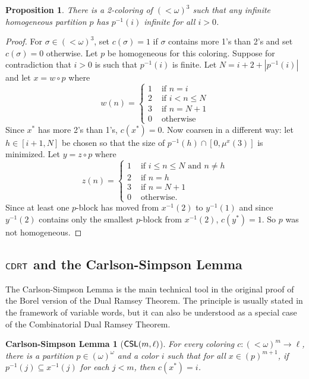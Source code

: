 \documentclass{amsart}
\newtheorem{prop}[thm]{Proposition}
\newtheorem*{carlsonsimpsonlemma}{Carlson-Simpson Lemma}
\theoremstyle{definition}
\theoremstyle{remark}
\newcommand{\system}[1]{\mbox{\fontfamily{cmss}\fontshape{n}\fontseries{m}%
    \selectfont#1}}
\newcommand{\cDRT}{\system{CDRT}}
\newcommand{\CSL}{\system{CSL}}
\newcommand{\block}[2]{{#1}^{-1}(#2)}
\begin{document}
\begin{prop}
\label{prop:2.13}
There is a 2-coloring of $(<\omega)^3$ such that any infinite homogeneous partition $p$ has $\block{p}{i}$ infinite for all $i > 0$.
\end{prop}

\begin{proof}
For $\sigma \in (<\omega)^3$, set $c(\sigma) = 1$ if $\sigma$ contains more 1's than 2's and set $c(\sigma)= 0$ 
otherwise. Let $p$ be homogeneous for this coloring.  Suppose for 
contradiction that $i > 0$ is such that $\block{p}{i}$ is finite. Let $N = i + 2 + |\block{p}{i}|$ and let $x = w\circ p$ where 
$$w(n) = \begin{cases} 1 &\text{ if } n=i\\
2 & \text{ if } i < n \leq N\\
3 & \text{ if } n = N+1\\
0 & \text{ otherwise}\end{cases}$$
Since $x^\ast$ has more 2's than 1's, 
$c(x^\ast) = 0$. Now coarsen in a different way: let $h \in [i+1,N]$ 
be chosen so that the size of $\block{p}{h}\cap [0,\mu^x(3)]$ is minimized. 
Let $y= z \circ p$ where
$$z(n) = \begin{cases} 1 & \text{ if } i\leq n \leq N \text{ and } n \neq h\\
                                    2 & \text{ if } n=h\\
                                    3 & \text{ if } n = N+1\\
                                    0 & \text{ otherwise.}\end{cases}$$
Since at least one $p$-block has moved from $\block{x}{2}$ to $\block{y}{1}$ and since $\block{y}{2}$ contains only the smallest $p$-block from $\block{x}{2}$, $c(y^\ast) = 1$.  So $p$ was not homogeneous.
\end{proof}


\subsection{$\cDRT$ and the Carlson-Simpson Lemma}\label{sec:2.3}

The Carlson-Simpson Lemma is the main technical tool in the original proof of the Borel version of the 
Dual Ramsey Theorem. The principle is usually stated in the framework of variable
words, but it can also be understood as a special case of the Combinatorial Dual Ramsey Theorem.  

\begin{carlsonsimpsonlemma}[$\CSL(m,\ell)$]
For every coloring $c:(<\omega)^{m} \rightarrow \ell$, there is a
partition $p\in(\omega)^\omega$ and a color $i$ such that for all $x
\in (p)^{m+1}$, if $\block{p}{j} \subseteq \block{x}{j}$ for each $j<m$, then 
$c(x^\ast) = i$.
\end{carlsonsimpsonlemma}
\end{document}

